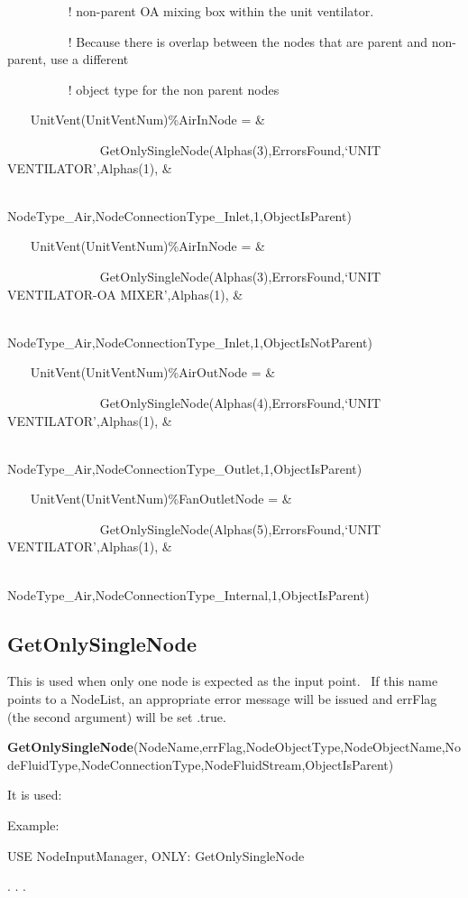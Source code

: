 ~~~~~~~~~ ! non-parent OA mixing box within the unit ventilator.

~~~~~~~~~ ! Because there is overlap between the nodes that are parent and non-parent, use a different

~~~~~~~~~ ! object type for the non parent nodes

~~~ UnitVent(UnitVentNum)\%AirInNode = \&

~~~~~~~~~~~~~~ GetOnlySingleNode(Alphas(3),ErrorsFound,`UNIT VENTILATOR',Alphas(1), \&

~~~~~~~~~~~~~~~~~~~~~~~~~~~ NodeType\_Air,NodeConnectionType\_Inlet,1,ObjectIsParent)

~~~ UnitVent(UnitVentNum)\%AirInNode = \&

~~~~~~~~~~~~~~ GetOnlySingleNode(Alphas(3),ErrorsFound,`UNIT VENTILATOR-OA MIXER',Alphas(1), \&

~~~~~~~~~~~~~~~~~~~~~~~~~~~ NodeType\_Air,NodeConnectionType\_Inlet,1,ObjectIsNotParent)

~~~ UnitVent(UnitVentNum)\%AirOutNode = \&

~~~~~~~~~~~~~~ GetOnlySingleNode(Alphas(4),ErrorsFound,`UNIT VENTILATOR',Alphas(1), \&

~~~~~~~~~~~~~~~~~~~~~~~~~~~ NodeType\_Air,NodeConnectionType\_Outlet,1,ObjectIsParent)

~~~ UnitVent(UnitVentNum)\%FanOutletNode = \&

~~~~~~~~~~~~~~ GetOnlySingleNode(Alphas(5),ErrorsFound,`UNIT VENTILATOR',Alphas(1), \&

~~~~~~~~~~~~~~~~~~~~~~~~~~~ NodeType\_Air,NodeConnectionType\_Internal,1,ObjectIsParent)

\subsection{GetOnlySingleNode}\label{getonlysinglenode}

This is used when only one node is expected as the input point.~ If this name points to a NodeList, an appropriate error message will be issued and errFlag (the second argument) will be set .true.

\textbf{GetOnlySingleNode}(NodeName,errFlag,NodeObjectType,NodeObjectName,NodeFluidType,NodeConnectionType,NodeFluidStream,ObjectIsParent)

It is used:

Example:

USE NodeInputManager, ONLY: GetOnlySingleNode

. . .

